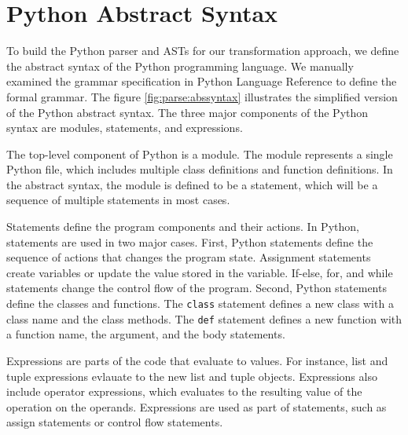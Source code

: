 \section{Python Abstract Syntax}\label{sec:pysyn}

To build the Python parser and ASTs for our transformation approach,
we define the abstract syntax of the Python programming language.
We manually examined the grammar specification in 
Python Language Reference \cite{pythonref} to define the formal grammar.
The figure \ref{fig:parse:abssyntax} 
illustrates the simplified version of the Python abstract syntax.
The three major components of the Python syntax are modules, statements, and
expressions.

The top-level component of Python is a module.
The module represents a single Python file, which includes multiple
class definitions and function definitions.
In the abstract syntax, the module is defined to be a statement,
which will be a sequence of multiple statements in most cases.

Statements define the program components and their actions. 
In Python, statements are used in two major cases.
First, Python statements define the sequence of actions that changes the
program state. Assignment statements create variables or update the
value stored in the variable. If-else, for, and while statements change
the control flow of the program.
Second, Python statements define the classes and functions.
The {\tt class} statement defines a new class with a class name and the
class methods. 
The {\tt def} statement defines a new function with a function name, the 
argument, and the body statements.

Expressions are parts of the code that evaluate to values.
For instance, list and tuple expressions evlauate to the new list and tuple
objects. Expressions also include operator expressions, which evaluates to
the resulting value of the operation on the operands.
Expressions are used as part of statements, such as assign statements or
control flow statements.

